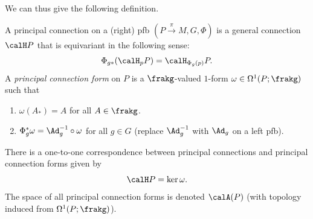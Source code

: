 We can thus give the following definition.

\begin{defn}
    A principal connection on a (right) \gls{pfb} $(P\overset{\pi}{\to}M,G,\Phi)$ is a general connection $\calH P$ that is equivariant in the following sense:
    \[\Phi_{g\ast}(\calH_pP)=\calH_{\Phi_g(p)}P.\]
    A \emph{principal connection form} on $P$ is a $\frakg$-valued $1$-form $\omega\in \Omega^1(P;\frakg)$ such that
    \begin{enumerate}
        \item $\omega(A_\ast)=A$ for all $A\in\frakg$.
        \item $\Phi_g^\ast\omega=\Ad_g^{-1}\circ\omega$ for all $g\in G$ (replace $\Ad_g^{-1}$ with $\Ad_g$ on a left \gls{pfb}).
    \end{enumerate}
    There is a one-to-one correspondence between principal connections and principal connection forms given by
    \[\calH P=\ker \omega.\]
    The space of all principal connection forms is denoted $\calA(P)$ (with topology induced from $\Omega^1(P;\frakg)$).
\end{defn}


